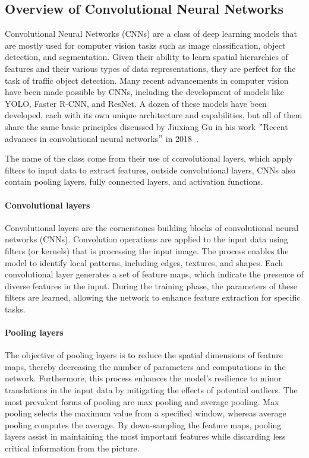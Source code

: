 
\subsection{Overview of Convolutional Neural Networks}\label{subsec:convolutional-neural-networks}

Convolutional Neural Networks (CNNs) are a class of deep learning models that are mostly used for computer vision tasks
such as image classification, object detection, and segmentation.
Given their ability to learn spatial hierarchies of features and their various types of data representations,
they are perfect for the task of traffic object detection.
Many recent advancements in computer vision have been made possible by CNNs, including the development of models like YOLO, Faster R-CNN, and ResNet.
A dozen of these models have been developed, each with its own unique architecture and capabilities, 
but all of them share the same basic principles discussed by Jiuxiang Gu in his work
\("\)Recent advances in convolutional neural networks\("\) in 2018~\cite{GU2018354}.

The name of the class come from their use of convolutional layers, which apply filters to input data to extract features, outside
convolutional layers, CNNs also contain pooling layers, fully connected layers, and activation functions.

\paragraph{Convolutional layers}\label{par:convolutional-layers}

Convolutional layers are the cornerstones building blocks of convolutional neural networks (CNNs).
Convolution operations are applied to the input data using filters (or kernels) that is processing the input image.
The process enables the model to identify local patterns, including edges, textures, and shapes.
Each convolutional layer generates a set of feature maps, which indicate the presence of diverse features in the input.
During the training phase, the parameters of these filters are learned,
allowing the network to enhance feature extraction for specific tasks.

\paragraph{Pooling layers}\label{par:pooling-layers}

The objective of pooling layers is to reduce the spatial dimensions of feature maps,
thereby decreasing the number of parameters and computations in the network.
Furthermore, this process enhances the model's resilience to minor
translations in the input data by mitigating the effects of potential outliers.
The most prevalent forms of pooling are max pooling and average pooling.
Max pooling selects the maximum value from a specified window, whereas average pooling computes the average.
By down-sampling the feature maps, pooling layers assist in maintaining the most important features while discarding less
critical information from the picture.

